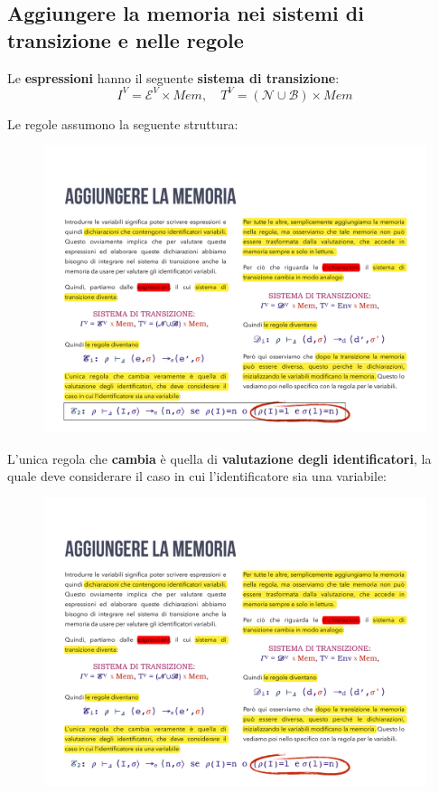 \documentclass[a4paper]{article}
\begin{document}
 	\subsection{Aggiungere la memoria nei sistemi di transizione e nelle regole}
 	
 	\begin{boxdef}
 		Le \textcolor{Red3}{\textbf{espressioni}} hanno il seguente \textbf{sistema di transizione}:
 		\begin{equation*}
 			I^{V} = \mathcal{E}^{V} \times Mem, \hspace{1em} T^{V} = \left(\mathcal{N} \cup \mathcal{B}\right) \times Mem
 		\end{equation*}
 	\end{boxdef}
 	
 	\noindent
 	Le regole assumono la seguente struttura:

 	\begin{figure}[!htp]
 		\centering
 		\includegraphics[width=.5\textwidth]{img/regola_espressione-update-1.pdf}
 	\end{figure}
 
 	\noindent
 	L'unica regola che \textbf{cambia} è quella di \textbf{valutazione degli identificatori}, la quale deve considerare il caso in cui l'identificatore sia una variabile:
 	
 	\begin{figure}[!htp]
 		\centering
 		\includegraphics[width=\textwidth]{img/regola_espressione-update-2.pdf}
 	\end{figure}
 	
\end{document}
